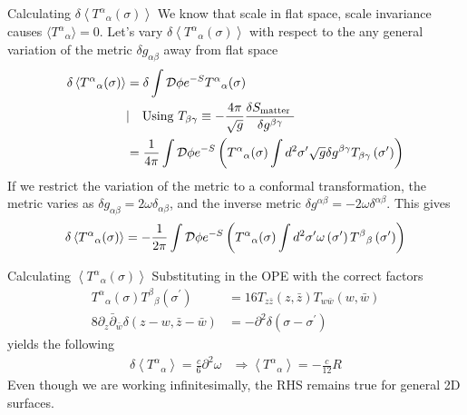 \documentclass{beamer}
\begin{document}
\begin{frame}{Calculating $\delta\left\langle {T^\alpha}_\alpha(\sigma)\right\rangle$}
We know that scale in flat space, scale invariance causes $\langle {T^\alpha}_\alpha\rangle = 0$. Let's vary $\delta\left\langle {T^\alpha}_\alpha(\sigma)\right\rangle$ with respect to the any general variation of the metric $\delta g_{\alpha\beta}$ away from flat space
    \begin{align}
\delta\left\langle {T^\alpha}_\alpha(\sigma)\right\rangle & =\delta \int \mathcal{D} \phi e^{-S} {T^\alpha}_\alpha(\sigma) \\
&|\quad \text{Using }T_{\beta \gamma}\equiv-\frac{4\pi}{\sqrt{g}} \frac{\delta S_{\text {matter }}}{\delta g^{\beta \gamma}} \notag \\
& =\frac{1}{4 \pi} \int \mathcal{D} \phi e^{-S}\left({T^\alpha}_\alpha(\sigma) \int d^2 \sigma^{\prime} \sqrt{g} \delta g^{\beta \gamma} T_{\beta \gamma}\left(\sigma^{\prime}\right)\right) \notag
    \end{align}
    If we restrict the variation of the metric to a conformal transformation, the metric varies as $\delta g_{\alpha \beta} = 2\omega \delta_{\alpha\beta}$, and the inverse metric $\delta g^{\alpha\beta} = -2\omega \delta^{\alpha\beta}$. This gives
    \begin{align}
        \delta\left\langle {T^\alpha}_\alpha(\sigma)\right\rangle=-\frac{1}{2 \pi} \int \mathcal{D} \phi e^{-S}\left({T^\alpha}_\alpha(\sigma) \int d^2 \sigma^{\prime} \omega\left(\sigma^{\prime}\right) {T^\beta}_\beta\left(\sigma^{\prime}\right)\right) \notag
    \end{align}
\end{frame}
\begin{frame}{Calculating $\left\langle {T^\alpha}_\alpha(\sigma)\right\rangle$}
    Substituting in the OPE with the correct factors
    \begin{align}
        {T^\alpha}_\alpha(\sigma) {T^\beta}_\beta\left(\sigma^{\prime}\right)&=16 T_{z \bar{z}}(z, \bar{z}) T_{w \bar{w}}(w, \bar{w})\\
        8 \partial_z \bar{\partial}_{\bar{w}} \delta(z-w, \bar{z}-\bar{w})&=-\partial^2 \delta\left(\sigma-\sigma^{\prime}\right)
    \end{align}
    yields the following
    \begin{align}
        \delta\left\langle {T^\alpha}_\alpha\right\rangle=\frac{c}{6} \partial^2 \omega &\Rightarrow\left\langle {T^\alpha}_\alpha\right\rangle=-\frac{c}{12} R
    \end{align}
    Even though we are working infinitesimally, the RHS remains true for general 2D surfaces.
\end{frame}
\end{document}
